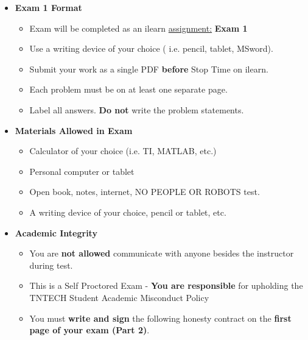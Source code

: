\documentclass[11pt]{article}
\begin{document}
\begin{itemize}
             	\item  \textbf{\Large Exam 1 Format}
\begin{itemize}
		
			\item Exam will be completed as an ilearn \underline{assignment:} {\bf Exam  1} 
			\item Use a writing device of your choice ( i.e. pencil, tablet, MSword).
			\item Submit your work as a single PDF {\bf before} Stop Time on ilearn.		 		\item Each problem must be on at least one separate page.
			\item Label all answers. {\bf Do not} write the problem statements.
\end{itemize}


		

		\item  \textbf{ Materials Allowed in Exam}

	\begin{itemize}

		\item  Calculator of your choice (i.e. TI, MATLAB, etc.)
		\item  Personal computer or tablet
		\item  Open book, notes, internet, NO PEOPLE OR ROBOTS test.\vspace{1mm}
		\item  A writing device of your choice, pencil or tablet, etc.

		\end{itemize}

\newpage
		\item  \textbf{ \Large Academic Integrity}
\begin{itemize}

		\item  You are {\bf not allowed} communicate with anyone besides the instructor during test. 
		\item This is a Self Proctored Exam - {\bf You are responsible} for upholding the TNTECH Student Academic Misconduct Policy
		\item  You must {\bf write and sign} the following honesty contract on the {\bf first page of your exam (Part 2)}. 


\end{itemize}
\end{itemize}
\end{document}
